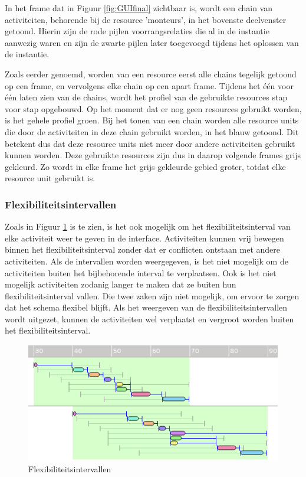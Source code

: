 In het frame dat in Figuur \ref{fig:GUIfinal} zichtbaar is, wordt een chain van activiteiten, behorende bij de resource 'monteurs', in het bovenste deelvenster getoond. Hierin zijn de rode pijlen voorrangsrelaties die al in de instantie aanwezig waren en zijn de zwarte pijlen later toegevoegd tijdens het oplossen van de instantie.

Zoals eerder genoemd, worden van een resource eerst alle chains tegelijk getoond op een frame, en vervolgens elke chain op een apart frame. Tijdens het \'e\'en voor \'e\'en laten zien van de chains, wordt  het profiel van de gebruikte resources stap voor stap opgebouwd. Op het moment dat er nog geen resources gebruikt worden, is het gehele profiel groen. Bij het tonen van een chain worden alle resource units die door de activiteiten in deze chain gebruikt worden, in het blauw getoond. Dit betekent dus dat deze resource units niet meer door andere activiteiten gebruikt kunnen worden. Deze gebruikte resources zijn dus in daarop volgende frames grijs gekleurd. Zo wordt in elke frame het grijs gekleurde gebied groter, totdat elke resource unit gebruikt is.

\subsubsection*{Flexibiliteitsintervallen}
Zoals in Figuur \ref{fig:flex-interval} is te zien, is het ook mogelijk om het flexibiliteitsinterval van elke activiteit weer te geven in de interface. Activiteiten kunnen vrij bewegen binnen het flexibiliteitsinterval zonder dat er conflicten ontstaan met andere activiteiten. Als de intervallen worden weergegeven, is het niet mogelijk om de activiteiten buiten het bijbehorende interval te verplaatsen. Ook is het niet mogelijk activiteiten zodanig langer te maken dat ze buiten hun flexibiliteitsinterval vallen. Die twee zaken zijn niet mogelijk, om ervoor te zorgen dat het schema flexibel blijft. Als het weergeven van de flexibiliteitsintervallen wordt uitgezet, kunnen de activiteiten wel verplaatst en vergroot worden buiten het flexibiliteitsinterval.

\begin{figure}[H]
\center
\includegraphics[width=.7\textwidth]{../images/flex-interval.png}
\caption{Flexibiliteitsintervallen}
\label{fig:flex-interval}
\end{figure}

